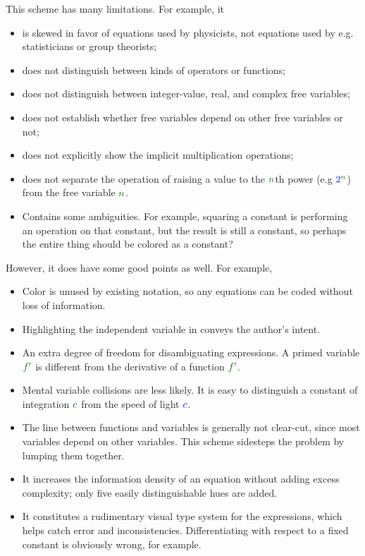 \documentclass[12pt,letterpaper]{article}
\begin{document}
This scheme has many limitations.
For example, it
\begin{itemize}
\item is skewed in favor of equations used by physicists,
not equations used by e.g. statisticians or group theorists;
\item does not distinguish between kinds of operators or functions;
\item does not distinguish between integer-value, real, and complex free variables;
\item does not establish whether free variables depend on other free variables or not;
\item does not explicitly show the implicit multiplication operations;
\item does not separate the operation of raising a value to the $\fv{n}$th power (e.g $\fc{2}^{\fv{n}}$) from the free variable $\fv{n}$.
\item Contains some ambiguities.
      For example, squaring a constant is performing an operation on that constant,
      but the result is still a constant,
      so perhaps the entire thing should be colored as a constant?
\end{itemize}

However, it does have some good points as well. For example,

\begin{itemize}
\item Color is unused by existing notation,
      so any equations can be coded without loss of information.
\item Highlighting the independent variable in  conveys the author's intent.
\item An extra degree of freedom for disambiguating expressions. A primed variable $\fv{f'}$ is different from the derivative of a function $\fv{f}\op{'}$.
\item Mental variable collisions are less likely.
      It is easy to distinguish a constant of integration $\fv{c}$ from the speed of light $\textcolor{blue}{c}$.
\item The line between functions and variables is generally not clear-cut,
      since most variables depend on other variables.
      This scheme sidesteps the problem by lumping them together.
\item It increases the information density of an equation without adding excess complexity;
      only five easily distinguishable hues are added.
\item It constitutes a rudimentary visual type system for the expressions,
      which helps catch error and inconsistencies.
      Differentiating with respect to a fixed constant is obviously wrong,
      for example.
\end{itemize}
\end{document}
